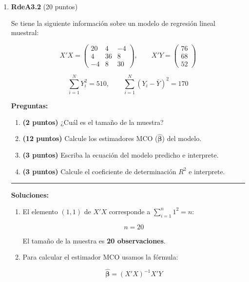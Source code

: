 \documentclass[10pt,a4paper]{article}
\begin{document}
\begin{enumerate}
      \item \textbf{RdeA3.2} (20 puntos) 
  
Se tiene la siguiente información sobre un modelo de regresión lineal muestral:

$$X'X = \begin{pmatrix}
20 & 4 & -4 \\
4 & 36 & 8 \\
-4 & 8 & 30
\end{pmatrix}, \qquad
X'Y = \begin{pmatrix}
76 \\
68 \\
52
\end{pmatrix}$$

$$\sum_{i=1}^{N} Y_i^2 = 510, \qquad \sum_{i=1}^{N}(Y_i - \bar{Y})^2 = 170$$

\vspace{0.5cm}

\textbf{Preguntas:}

\begin{enumerate}
    \item[(a)] \textbf{(2 puntos)} ¿Cuál es el tamaño de la muestra?
    \item[(b)] \textbf{(12 puntos)} Calcule los estimadores MCO ($\hat{\bm{\beta}}$) del modelo.
    \item[(c)] \textbf{(3 puntos)} Escriba la ecuación del modelo predicho e interprete.
    \item[(d)] \textbf{(3 puntos)} Calcule el coeficiente de determinación $R^2$ e interprete.
\end{enumerate}

\vspace{1cm}
\hrule
\vspace{0.5cm}

{\color{blue}\textbf{Soluciones:}

\begin{enumerate}

\item[(a)] El elemento $(1,1)$ de $X'X$ corresponde a $\sum_{i=1}^{n} 1^2 = n$:

$$n = 20$$

El tamaño de la muestra es \textbf{20 observaciones}.

\item[(b)] Para calcular el estimador MCO usamos la fórmula:

$$\hat{\bm{\beta}} = (X'X)^{-1} X'Y$$


\end{enumerate}}
\end{enumerate}
\end{document}

